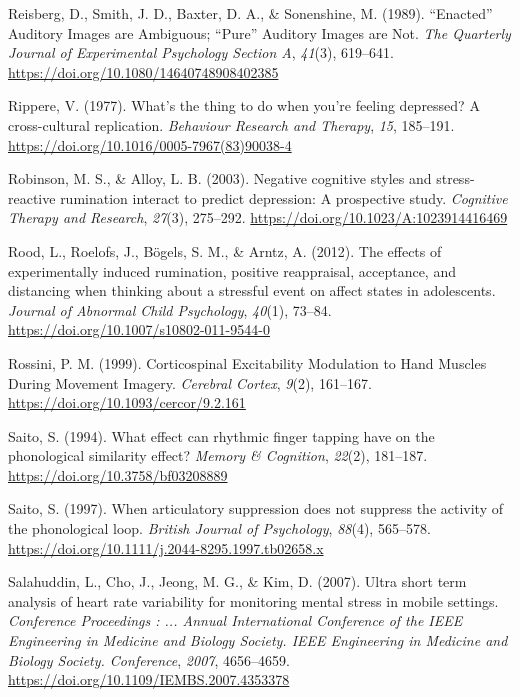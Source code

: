 \documentclass[a4paper,12pt,twoside,openright,oldfontcommands]{memoir}
\begin{document}
\leavevmode\hypertarget{ref-reisberg_enacted_1989}{}%
Reisberg, D., Smith, J. D., Baxter, D. A., \& Sonenshine, M. (1989). ``Enacted'' Auditory Images are Ambiguous; ``Pure'' Auditory Images are Not. \emph{The Quarterly Journal of Experimental Psychology Section A}, \emph{41}(3), 619--641. \url{https://doi.org/10.1080/14640748908402385}

\leavevmode\hypertarget{ref-Rippere1977}{}%
Rippere, V. (1977). What's the thing to do when you're feeling depressed? A cross-cultural replication. \emph{Behaviour Research and Therapy}, \emph{15}, 185--191. \url{https://doi.org/10.1016/0005-7967(83)90038-4}

\leavevmode\hypertarget{ref-Robinson2003}{}%
Robinson, M. S., \& Alloy, L. B. (2003). Negative cognitive styles and stress-reactive rumination interact to predict depression: A prospective study. \emph{Cognitive Therapy and Research}, \emph{27}(3), 275--292. \url{https://doi.org/10.1023/A:1023914416469}

\leavevmode\hypertarget{ref-Rood2012}{}%
Rood, L., Roelofs, J., Bögels, S. M., \& Arntz, A. (2012). The effects of experimentally induced rumination, positive reappraisal, acceptance, and distancing when thinking about a stressful event on affect states in adolescents. \emph{Journal of Abnormal Child Psychology}, \emph{40}(1), 73--84. \url{https://doi.org/10.1007/s10802-011-9544-0}

\leavevmode\hypertarget{ref-rossini_corticospinal_1999}{}%
Rossini, P. M. (1999). Corticospinal Excitability Modulation to Hand Muscles During Movement Imagery. \emph{Cerebral Cortex}, \emph{9}(2), 161--167. \url{https://doi.org/10.1093/cercor/9.2.161}

\leavevmode\hypertarget{ref-saito_what_1994}{}%
Saito, S. (1994). What effect can rhythmic finger tapping have on the phonological similarity effect? \emph{Memory \& Cognition}, \emph{22}(2), 181--187. \url{https://doi.org/10.3758/bf03208889}

\leavevmode\hypertarget{ref-saito_when_1997}{}%
Saito, S. (1997). When articulatory suppression does not suppress the activity of the phonological loop. \emph{British Journal of Psychology}, \emph{88}(4), 565--578. \url{https://doi.org/10.1111/j.2044-8295.1997.tb02658.x}

\leavevmode\hypertarget{ref-Salahuddin2007}{}%
Salahuddin, L., Cho, J., Jeong, M. G., \& Kim, D. (2007). Ultra short term analysis of heart rate variability for monitoring mental stress in mobile settings. \emph{Conference Proceedings : ... Annual International Conference of the IEEE Engineering in Medicine and Biology Society. IEEE Engineering in Medicine and Biology Society. Conference}, \emph{2007}, 4656--4659. \url{https://doi.org/10.1109/IEMBS.2007.4353378}
\end{document}

